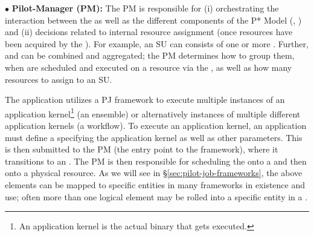 \documentclass[conference]{IEEEtran}
\begin{document}
\noindent$\bullet$ \textbf{Pilot-Manager (PM):} The PM is responsible for (i)
  orchestrating the interaction between the \pilots as well as the
  different components of the P* Model (\cus, \sus) and (ii) decisions
  related to internal resource assignment (once resources have been
  acquired by the \pilotjob).  For example, an SU can consists of one
  or more \cus. Further, \cus and \sus can be combined and aggregated;
  the PM determines how to group them, when \sus are scheduled and
  executed on a resource via the \pilot, as well as how many resources
  to assign to an SU.







  
  The application utilizes a PJ framework to execute multiple
  instances of an application kernel\footnote{An application kernel is
  the actual binary that gets executed.} (an ensemble) or
  alternatively instances of multiple different application kernels (a
  workflow).  To execute an application kernel, an application must
  define a \cu specifying the application kernel as well as other
  parameters. This \cu is then submitted to the PM (the entry point to
  the \pilotjob framework), where it transitions to an \su. The PM is
  then responsible for scheduling the \su onto a \pilot and then onto
  a physical resource.  As we will see in
  \S\ref{sec:pilot-job-frameworks}, the above elements can be mapped
  to specific entities in many \pilotjob frameworks in existence and
  use; often more than one logical element may be rolled into
  a specific entity in a \pilotjob.

% 
% 
\end{document}
